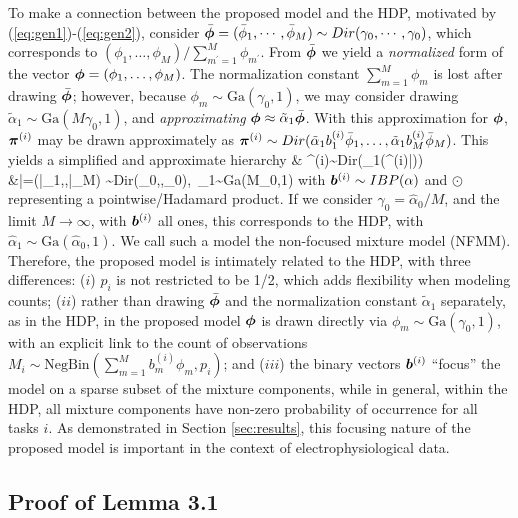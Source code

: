 \documentclass[journal]{IEEEtran}
\begin{document}
To make a connection between the proposed model and the HDP, motivated by (\ref{eq:gen1})-(\ref{eq:gen2}), consider $\bar{\boldsymbol{\phi}}=(\bar{\phi}_1,\cdots,\bar{\phi}_M) \sim \relax{Dir}(\gamma_0,\cdots,\gamma_0)$, which corresponds to $(\phi_1,\dots,\phi_M)/\sum_{m^\prime=1}^M \phi_{m^\prime}$. From $\bar{\boldsymbol{\phi}}$ we yield a \emph{normalized} form of the vector $\boldsymbol{\phi}=(\phi_1,\dots,\phi_M)$. The normalization constant $\sum_{m=1}^M\phi_m$ is lost after drawing $\bar{\boldsymbol{\phi}}$; however, because $\phi_m\sim\mbox{Ga}(\gamma_0,1)$, we may consider drawing $\tilde{\alpha}_1\sim\mbox{Ga}(M\gamma_0,1)$, and \emph{approximating} ${\boldsymbol{\phi}}\approx\tilde{\alpha}_1\bar{\boldsymbol{\phi}}$. With this approximation for $\boldsymbol{\phi}$, $\boldsymbol{\pi}^{(i)}$ may be drawn approximately as $\boldsymbol{\pi}^{(i)}\sim\relax{Dir}(\tilde{\alpha}_1b_1^{(i)}\bar{\phi}_1,\dots,\tilde{\alpha}_1b_M^{(i)}\bar{\phi}_M)$. This yields a simplified and approximate hierarchy
\beqs & \piv^{(i)}\sim\mbox{Dir}(\tilde{\alpha}_1(\bv^{(i)}\odot\bar{\phiv}))\\ &\bar{\phiv}=(\bar{\phi}_1,\cdots,\bar{\phi}_M) \sim \mbox{Dir}(\gamma_0,\cdots,\gamma_0),~\tilde{\alpha}_1\sim\mbox{Ga}(M\gamma_0,1)\nonumber\eeqs
with $\boldsymbol{b}^{(i)}\sim\relax{IBP}(\alpha)$ and $\odot$ representing a pointwise/Hadamard product. If we consider $\gamma_0=\hat{\alpha}_0/M$, and the limit $M\rightarrow\infty$, with $\boldsymbol{b}^{(i)}$ all ones, this corresponds to the HDP, with $\hat{\alpha}_1\sim\mbox{Ga}(\hat{\alpha}_0,1)$. 
{We call such a model the non-focused mixture model (NFMM).}
Therefore, the proposed model is intimately related to the HDP, with three differences: ($i$) $p_i$ is not restricted to be 1/2, which adds flexibility when modeling counts; ($ii$) rather than drawing $\bar{\boldsymbol{\phi}}$ and the normalization constant $\tilde{\alpha}_1$ separately, as in the HDP, in the proposed model $\boldsymbol{\phi}$ is drawn directly via $\phi_m\sim\mbox{Ga}(\gamma_0,1)$, with an explicit link to the count of observations $M_i\sim\mbox{NegBin}(\sum_{m=1}^Mb_m^{(i)}\phi_m,p_i)$; and ($iii$) the binary vectors $\boldsymbol{b}^{(i)}$ ``focus'' the model on a sparse subset of the mixture components, while in general, within the HDP, all mixture components have non-zero probability of occurrence for all tasks $i$. As demonstrated in Section \ref{sec:results}, this focusing nature of the proposed model is important in the context of electrophysiological data.



\subsection{Proof of Lemma 3.1}
\end{document}
